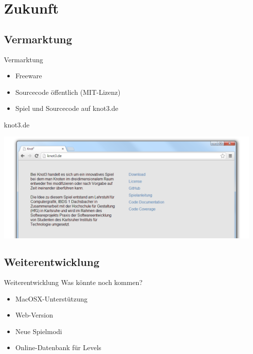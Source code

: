 \documentclass[18pt]{beamer}
\begin{document}




\section{Zukunft}
\subsection{Vermarktung}
\begin{frame}{Vermarktung}
\begin{itemize}
\item Freeware
\item Sourcecode öffentlich (MIT-Lizenz)
\item Spiel und Sourcecode auf knot3.de

\end{itemize}

\end{frame}


\begin{frame}{knot3.de}
\begin{center}
\includegraphics[scale=0.44]{webseite}
\end{center}

\end{frame}

\subsection{Weiterentwicklung}
\begin{frame}{Weiterentwicklung}
Was könnte noch kommen?
\begin{itemize}
\item MacOSX-Unterstützung 
\item Web-Version
\item Neue Spielmodi
\item Online-Datenbank für Levels
\end{itemize}


\end{frame}
\end{document}
